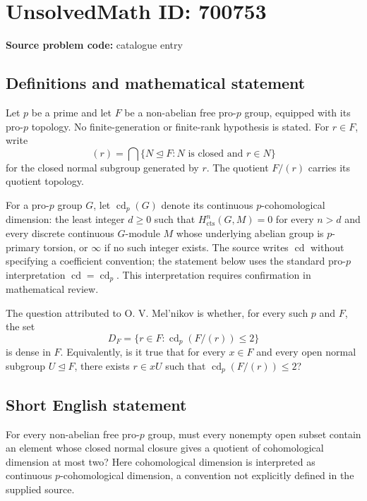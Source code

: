 \documentclass[11pt]{article}
\begin{document}
\section*{UnsolvedMath ID: 700753}
\textbf{Source problem code:} catalogue entry
\subsection{Definitions and mathematical statement}
Let \(p\) be a prime and let \(F\) be a non-abelian free pro-\(p\) group, equipped with its pro-\(p\) topology. No finite-generation or finite-rank hypothesis is stated. For \(r\in F\), write
\[
(r)=\bigcap\{N\trianglelefteq F:N\text{ is closed and }r\in N\}
\]
for the closed normal subgroup generated by \(r\). The quotient \(F/(r)\) carries its quotient topology.

For a pro-\(p\) group \(G\), let \(\operatorname{cd}_p(G)\) denote its continuous \(p\)-cohomological dimension: the least integer \(d\geq0\) such that \(H^n_{\mathrm{cts}}(G,M)=0\) for every \(n>d\) and every discrete continuous \(G\)-module \(M\) whose underlying abelian group is \(p\)-primary torsion, or \(\infty\) if no such integer exists. The source writes \(\operatorname{cd}\) without specifying a coefficient convention; the statement below uses the standard pro-\(p\) interpretation \(\operatorname{cd}=\operatorname{cd}_p\). This interpretation requires confirmation in mathematical review.

The question attributed to O. V. Mel'nikov is whether, for every such \(p\) and \(F\), the set
\[
D_F=\{r\in F:\operatorname{cd}_p(F/(r))\leq2\}
\]
is dense in \(F\). Equivalently, is it true that for every \(x\in F\) and every open normal subgroup \(U\trianglelefteq F\), there exists \(r\in xU\) such that \(\operatorname{cd}_p(F/(r))\leq2\)?
\subsection{Short English statement}
For every non-abelian free pro-\(p\) group, must every nonempty open subset contain an element whose closed normal closure gives a quotient of cohomological dimension at most two? Here cohomological dimension is interpreted as continuous \(p\)-cohomological dimension, a convention not explicitly defined in the supplied source.
\end{document}
